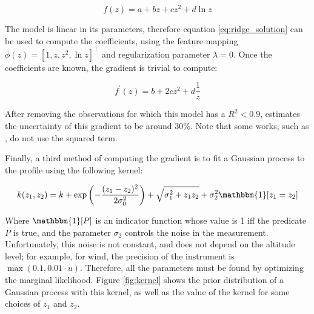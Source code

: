 \documentclass[a4paper]{book}
\begin{document}
\begin{equation}
\label{eq:logmodel}
f(z)=a+bz+cz^2+d\ln z
\end{equation}

The model is linear in its parameters, therefore equation \ref{eq:ridge_solution} can be used to compute the coefficients, using the feature mapping $\phi(z)=\left[1,z,z^2,\ln z\right]^\intercal$ and regularization parameter $\lambda=0$. Once the coefficients are known, the gradient is trivial to compute:

\begin{equation}
\label{eq:log_gradient}
f^\prime(z)=b+2cz^2+d\frac{1}{z}
\end{equation}

After removing the observations for which this model has a $R^2<0.9$, \cite{windlogprofile} estimates the uncertainty of this gradient to be around 30\%. Note that some works, such as \cite{windprof_nosqr}, do not use the squared term.

Finally, a third method of computing the gradient is to fit a Gaussian process to the profile using the following kernel:

\begin{equation}
\label{eq:kernel}
k(z_1,z_2)=k+\exp\left(-\frac{(z_1-z_2)^2}{2\sigma_0^2}\right)+\sqrt{\sigma_1^2+ z_1 z_2}+\sigma_2^2 \mathbbm{1}[z_1=z_2]
\end{equation}

Where $\mathbbm{1}[P]$ is an indicator function whose value is 1 iff the predicate $P$ is true, and the parameter $\sigma_2$ controls the noise in the measurement. Unfortunately, this noise is not constant, and does not depend on the altitude level; for example, for wind, the precision of the instrument is $\max(0.1,0.01\cdot u)$. Therefore, all the parameters must be found by optimizing the marginal likelihood. Figure \ref{fig:kernel} shows the prior distribution of a Gaussian process with this kernel, as well as the value of the kernel for some choices of $z_1$ and $z_2$.
\end{document}
